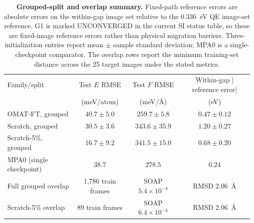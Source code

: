 \begin{table}[htbp]
\centering
\caption{\textbf{Grouped-split and overlap summary.} Fixed-path reference errors are absolute errors on the within-gap image set relative to the 0.336~eV QE image-set reference. G1 is marked UNCONVERGED in the current SI status table, so these are fixed-image reference errors rather than physical migration barriers. Three-initialization entries report mean $\pm$ sample standard deviation; MPA0 is a single-checkpoint comparator. The overlap rows report the minimum training-set distance across the 25 target images under the stated metrics.}
\label{tab:a2_grouped_audit_summary}
\begin{tabular}{lccc}
\toprule
Family/split & Test $E$ RMSE & Test $F$ RMSE & Within-gap $|$reference error$|$ \\
 & (meV/atom) & (meV/\AA) & (eV) \\
\midrule
OMAT-FT, grouped & $40.7 \pm 5.0$ & $259.7 \pm 5.8$ & $0.47 \pm 0.12$ \\
Scratch, grouped & $30.5 \pm 3.6$ & $343.6 \pm 35.9$ & $1.20 \pm 0.27$ \\
Scratch-5\%, grouped & $16.7 \pm 9.2$ & $341.5 \pm 15.0$ & $0.68 \pm 0.20$ \\
MPA0 (single checkpoint) & $38.7$ & $278.5$ & $0.24$ \\
\midrule
Full grouped overlap & 1,786 train frames & SOAP $5.4\times10^{-4}$ & RMSD 2.06~\AA{} \\
Scratch-5\% overlap & 89 train frames & SOAP $6.4\times10^{-4}$ & RMSD 2.06~\AA{} \\
\bottomrule
\end{tabular}
\end{table}
